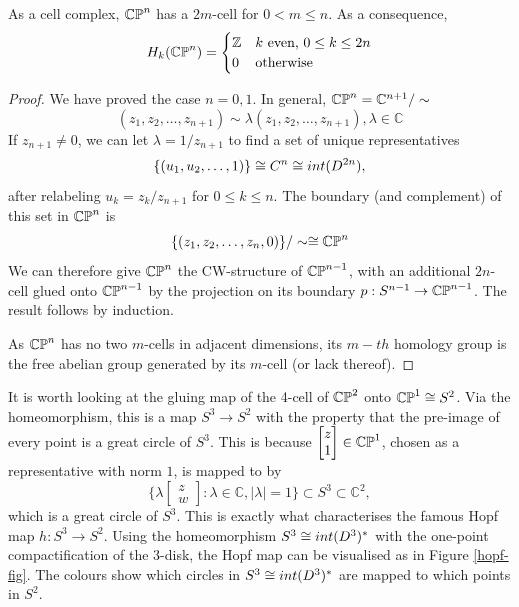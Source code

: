 \begin{prop}
As a cell complex, $\mathbb{CP}^{n}$ has a $2m$-cell for $0<m\leq n$. As a consequence,
$$H_k(\mathbb{CP}^{n})=\begin{cases} 
      \mathbb{Z} & k \text{ even, } 0\leq k \leq 2n \\
      0 & \text{otherwise}
   \end{cases}
$$
\end{prop}
\begin{proof}
We have proved the case $n=0,1$. In general, $\mathbb{CP}^{n}=\mathbb{C}^{n+1}/\sim$
$$(z_1,z_2,\dots,z_{n+1})\sim \lambda (z_1,z_2,\dots,z_{n+1}), \lambda \in \mathbb{C}$$ If $z_{n+1}\neq 0$, we can let $\lambda=1/z_{n+1}$ to find a set of unique representatives
$$\{(u_1,u_2,\dots,1)\}\cong C^{n}\cong int(D^{2n}),$$
after relabeling $u_k=z_k/z_{n+1}$ for $0\leq k \leq n$.
The boundary (and complement) of this set in $\mathbb{CP}^{n}$ is $$\{(z_1,z_2,\dots,z_n,0)\}/\sim \cong \mathbb{CP}^{n}$$ We can therefore give $\mathbb{CP}^{n}$ the CW-structure of $\mathbb{CP}^{n-1}$, with an additional $2n$-cell glued onto $\mathbb{CP}^{n-1}$ by the projection on its boundary $p:S^{n-1}\rightarrow \mathbb{CP}^{n-1}$. The result follows by induction. 

As $\mathbb{CP}^{n}$ has no two $m$-cells in adjacent dimensions, its $m-th$ homology group is the free abelian group generated by its $m$-cell (or lack thereof).
\end{proof}
\begin{remark}\label{hopf}
It is worth looking at the gluing map of the 4-cell of $\mathbb{CP}^{2}$ onto $\mathbb{CP}^{1}\cong S^{2}$. Via the homeomorphism, this is a map $S^{3}\rightarrow S^{2}$ with the property that the pre-image of every point is a great circle of $S^3$. This is because $\begin{bmatrix}z\\1 \end{bmatrix}\in \mathbb{CP}^{1}$, chosen as a representative with norm $1$, is mapped to by $$\{\lambda \begin{bmatrix}z\\w \end{bmatrix} : \lambda\in \mathbb{C},|\lambda|=1\}\subset S^3\subset \mathbb{C}^2 ,$$ which is a great circle of $S^{3}$. This is exactly what characterises the famous Hopf map $h:S^3\rightarrow S^2$. Using the homeomorphism $S^3\cong int(D^3)^*$ with the one-point compactification of the $3$-disk, the Hopf map can be visualised as in Figure \ref{hopf-fig}. The colours show which circles in $S^3\cong int(D^3)^*$ are mapped to which points in $S^2$.
\end{remark}
